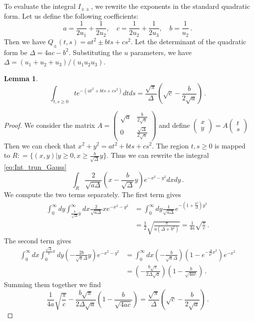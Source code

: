\documentclass[11pt]{article}
\numberwithin{equation}{section}
\newtheorem{lemma}{Lemma}[section]
\begin{document}
To evaluate the integral $I_{\pm\pm}$, we rewrite the exponents in the standard quadratic form. Let us define the following coefficients:
\[a = \frac{1}{2u_1} + \frac{1}{2u_2}, \quad c = \frac{1}{2u_2} + \frac{1}{2u_3}, \quad b = \frac{1}{u_2}\,.\]
Then we have $Q_{\pm}(t,s) = at^2 \pm bts + cs^2 $. Let the determinant of the quadratic form be $\Delta = 4ac - b^2$. Substituting the $u$ parameters, we have $\Delta = (u_1+u_2+u_3)/(u_1 u_2 u_3)$. 
\begin{lemma}
\begin{equation}\label{eq:Int_trun_Gauss}
	\int_{t,s\geq 0}  te^{-(at^2 + bts + cs^2)}dtds = \frac{\sqrt{\pi}}{\Delta}(\sqrt{c} - \frac{b}{2\sqrt{a}})\,.
\end{equation}
\end{lemma}
\begin{proof}
	We consider the matrix $A = \begin{pmatrix}
		\sqrt{a}& \frac{b}{2\sqrt{a}}\\0&\frac{\sqrt{\Delta}}{2\sqrt{a}}
	\end{pmatrix}$ and define $\begin{pmatrix}
	x\\y
	\end{pmatrix} = A\begin{pmatrix}
	t\\s
	\end{pmatrix}$
	Then we can check that $x^2 + y^2 = at^2 + bts+cs^2$. The region $t,s \geq 0$ is mapped to $ R : =  \{(x,y)|y\geq0,x \geq \frac{b}{\sqrt{\Delta}} y\}$. Thus we can rewrite the integral \eqref{eq:Int_trun_Gauss}
	\begin{equation}
		\int_{R}\frac{2}{\sqrt{a\Delta}}(x - \frac{b}{\sqrt{\Delta}}y)e^{-x^2 - y^2}dxdy\,.
	\end{equation}
	We compute the two terms separately. The first term gives
	\begin{equation}
		\begin{aligned}
			\int_0^\infty dy\int_{\frac{b}{\sqrt{\Delta}} y}^\infty dx\frac{2}{\sqrt{a\Delta}}xe^{-x^2 - y^2} &= \int_0^\infty dy\frac{1}{\sqrt{a\Delta}}e^{- (1 + \frac{b^2}{\Delta}) y^2}\\
			& =  \frac{1}{2}\sqrt{\frac{\pi}{a(\Delta+b^2)}} =  \frac{1}{4a}\sqrt{\frac{\pi}{c}}\,.
		\end{aligned}
	\end{equation}
	The second term gives
		\begin{equation}
			\begin{aligned}	
				\int_0^{\infty}dx\int_0^{\frac{\sqrt{\Delta}}{b}x}dy(-\frac{2b}{\sqrt{a}\Delta}y)e^{-x^2 - y^2} &= 		\int_0^{\infty}dx(-\frac{b}{\sqrt{a}\Delta})(1 - e^{-\frac{\Delta}{b^2}x^2})e^{-x^2}\\
				& = (-\frac{b\sqrt{\pi}}{2\Delta\sqrt{a}}) (1 - \frac{b}{\sqrt{4ac}})\,.
			\end{aligned}
	\end{equation}
	Summing them together we find 
	\begin{equation}
		\frac{1}{4a}\sqrt{\frac{\pi}{c}} -\frac{b\sqrt{\pi}}{2\Delta\sqrt{a}}(1 - \frac{b}{\sqrt{4ac}}) = \frac{\sqrt{\pi}}{\Delta}(\sqrt{c} - \frac{b}{2\sqrt{a}})\,.
	\end{equation}
\end{proof}
\end{document}
